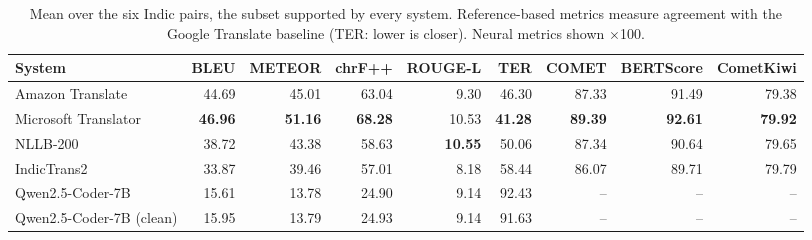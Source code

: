 \begin{table}[t]
\centering
\caption{Mean over the six Indic pairs, the subset supported by every system. Reference-based metrics measure agreement with the Google Translate baseline (TER: lower is closer). Neural metrics shown $\times$100.\label{tab:indic6}}
\begin{tabular}{lrrrrrrrr}
\toprule
System & BLEU & METEOR & chrF++ & ROUGE-L & TER & COMET & BERTScore & CometKiwi \\
\midrule
Amazon Translate & 44.69 & 45.01 & 63.04 & 9.30 & 46.30 & 87.33 & 91.49 & 79.38 \\
Microsoft Translator & \textbf{46.96} & \textbf{51.16} & \textbf{68.28} & 10.53 & \textbf{41.28} & \textbf{89.39} & \textbf{92.61} & \textbf{79.92} \\
NLLB-200 & 38.72 & 43.38 & 58.63 & \textbf{10.55} & 50.06 & 87.34 & 90.64 & 79.65 \\
IndicTrans2 & 33.87 & 39.46 & 57.01 & 8.18 & 58.44 & 86.07 & 89.71 & 79.79 \\
Qwen2.5-Coder-7B & 15.61 & 13.78 & 24.90 & 9.14 & 92.43 & -- & -- & -- \\
Qwen2.5-Coder-7B (clean) & 15.95 & 13.79 & 24.93 & 9.14 & 91.63 & -- & -- & -- \\
\bottomrule
\end{tabular}
\end{table}
